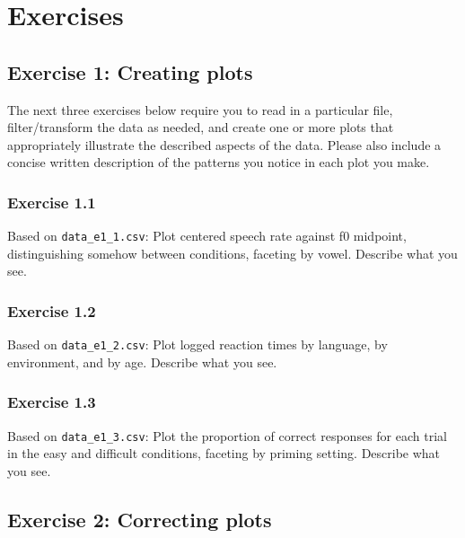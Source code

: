 \documentclass[
]{article}
\begin{document}
\hypertarget{exercises}{%
\section{Exercises}\label{exercises}}

\hypertarget{exercise-1-creating-plots}{%
\subsection{Exercise 1: Creating
plots}\label{exercise-1-creating-plots}}

The next three exercises below require you to read in a particular file,
filter/transform the data as needed, and create one or more plots that
appropriately illustrate the described aspects of the data. Please also
include a concise written description of the patterns you notice in each
plot you make.

\hypertarget{exercise-1.1}{%
\subsubsection{Exercise 1.1}\label{exercise-1.1}}

Based on \texttt{data\_e1\_1.csv}: Plot centered speech rate against f0
midpoint, distinguishing somehow between conditions, faceting by vowel.
Describe what you see.

\hypertarget{exercise-1.2}{%
\subsubsection{Exercise 1.2}\label{exercise-1.2}}

Based on \texttt{data\_e1\_2.csv}: Plot logged reaction times by
language, by environment, and by age. Describe what you see.

\hypertarget{exercise-1.3}{%
\subsubsection{Exercise 1.3}\label{exercise-1.3}}

Based on \texttt{data\_e1\_3.csv}: Plot the proportion of correct
responses for each trial in the easy and difficult conditions, faceting
by priming setting. Describe what you see.

\hypertarget{exercise-2-correcting-plots}{%
\subsection{Exercise 2: Correcting
plots}\label{exercise-2-correcting-plots}}
\end{document}
